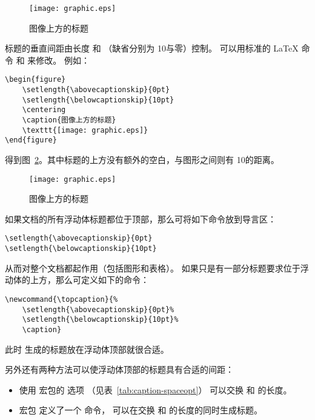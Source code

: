 \begin{figure} 
	\centering 
	\caption{图像上方的标题} \label{fig:verynearcap}
	\texttt{[image: graphic.eps]} 
\end{figure}

标题的垂直间距由长度  和 
（缺省分别为 10\pt 与零）控制。
可以用标准的 \LaTeX{} 命令  和  来修改。
例如：
\begin{lstlisting}
\begin{figure} 
	\setlength{\abovecaptionskip}{0pt} 
	\setlength{\belowcaptionskip}{10pt} 
	\centering 
	\caption{图像上方的标题} 
	\texttt{[image: graphic.eps]} 
\end{figure}
\end{lstlisting}
得到图~\ref{fig:normalabovefig}。其中标题的上方没有额外的空白，与图形之间则有 10\pt 的距离。

\begin{figure} 
	\setlength{\abovecaptionskip}{0pt} 
	\setlength{\belowcaptionskip}{10pt} 
	\centering 
	\caption{图像上方的标题}\label{fig:normalabovefig}
	\texttt{[image: graphic.eps]} 
\end{figure}

如果文档的所有浮动体标题都位于顶部，那么可将如下命令放到导言区：
\begin{lstlisting}
\setlength{\abovecaptionskip}{0pt}
\setlength{\belowcaptionskip}{10pt}
\end{lstlisting}
从而对整个文档都起作用（包括图形和表格）。
如果只是有一部分标题要求位于浮动体的上方，那么可定义如下的命令：
\begin{lstlisting}
\newcommand{\topcaption}{% 
	\setlength{\abovecaptionskip}{0pt}% 
	\setlength{\belowcaptionskip}{10pt}% 
	\caption}
\end{lstlisting}
此时  生成的标题放在浮动体顶部就很合适。

另外还有两种方法可以使浮动体顶部的标题具有合适的间距：
\begin{itemize}
	\item 使用  宏包的  选项
	（见表~\ref{tab:caption-spaceopt}）
	可以交换  和  的长度。
	
	\item {} 宏包 \cite{topcapt-doc} 定义了一个  命令，
	可以在交换   和  的长度的同时生成标题。
\end{itemize}


